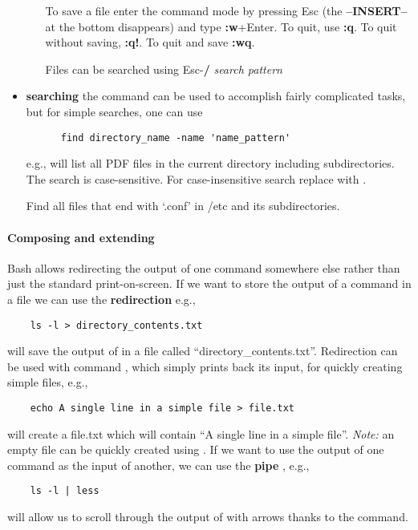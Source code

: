 \begin{itemize}
\begin{itemize}
    To save a file enter the command mode by pressing Esc (the \textbf{--INSERT--} at the bottom disappears) and type \textbf{:w}+Enter. To quit, use \textbf{:q}. To quit without saving, \textbf{:q!}. To quit and save \textbf{:wq}.

    Files can be searched using Esc-\textbf{/} \emph{search pattern}
  \end{itemize}
\item
  \textbf{searching}
  the command  can be used to accomplish fairly complicated tasks, but for simple searches, one can use
    \begin{lstlisting}
      find directory_name -name 'name_pattern'
\end{lstlisting}
  e.g., 
  will list all PDF files in the current directory including subdirectories. The search is case-sensitive. For case-insensitive search replace  with .

    \begin{exercise}
        Find all files that end with `.conf' in /etc and its subdirectories.
    \end{exercise} 
\end{itemize}

\paragraph{Composing and extending}

Bash allows redirecting the output of one command somewhere else rather than just the standard print-on-screen. If we want to store the output of a command in a file we can use the
\textbf{redirection} \ls{>} e.g.,
\begin{lstlisting}
    ls -l > directory_contents.txt
\end{lstlisting}
will save the output of  in a file called ``directory\_contents.txt''. Redirection can be used with command , which simply prints back its input, for quickly creating
simple files, e.g.,
\begin{lstlisting}
    echo A single line in a simple file > file.txt
\end{lstlisting}
will create a file.txt which will contain ``A single line in a simple file''. \emph{Note:} an empty file can be quickly created using . If we want to use the output of one command as the input of another, we
can use the \textbf{pipe} \ls{\|}, e.g.,
\begin{lstlisting}
    ls -l | less
\end{lstlisting}
will allow us to scroll through the output of  with arrows thanks to the  command.

